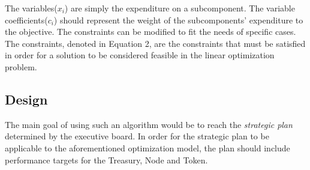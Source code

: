 \documentclass[conference,letterpaper]{IEEEtran}
\begin{document}
            The variables($x_i$) are simply the expenditure on a subcomponent. The
            variable coefficients($c_i$) should represent the weight of the subcomponents'
            expenditure to the objective. The constraints can be modified to fit the needs
            of specific cases. The constraints, denoted in Equation 2, are the constraints
            that must be satisfied in order for a solution to be considered feasible in
            the linear optimization problem.

        \subsection{Design}
            The main goal of using such an algorithm would be to reach the
            \textit{strategic plan} determined by the executive board. In order for the
            strategic plan to be applicable to the aforementioned optimization model, the
            plan should include performance targets for the Treasury, Node and Token.
\end{document}
